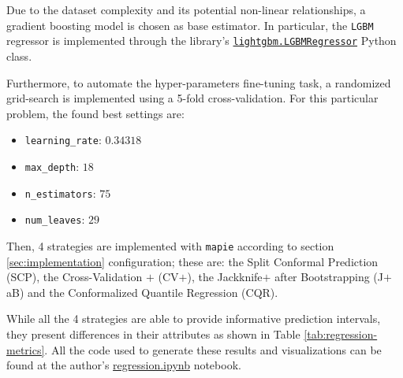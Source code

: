 Due to the dataset complexity and its potential non-linear relationships, a gradient boosting model is chosen as base estimator. In particular, the \texttt{LGBM} regressor is implemented through the library's \href{https://lightgbm.readthedocs.io/en/latest/pythonapi/lightgbm.LGBMRegressor.html#lightgbm.LGBMRegressor}{\texttt{lightgbm.LGBMRegressor}} Python class. 

Furthermore, to automate the hyper-parameters fine-tuning task, a randomized grid-search is implemented using a 5-fold cross-validation. For this particular problem, the found best settings are:
\begin{itemize}
    \setlength{\itemsep}{0pt}
    \item \texttt{learning\_{}rate}: $0.34318$
    \item \texttt{max\_{}depth}: $18$
    \item \texttt{n\_{}estimators}: $75$
    \item \texttt{num\_{}leaves}: $29$
\end{itemize}

Then, 4 strategies are implemented with \texttt{mapie} according to section \ref{sec:implementation} configuration; these are: the Split Conformal Prediction (SCP), the Cross-Validation $+$ (CV$+$), the Jackknife$+$ after Bootstrapping (J$+$aB) and the Conformalized Quantile Regression (CQR).

While all the 4 strategies are able to provide informative prediction intervals, they present differences in their attributes as shown in Table \ref{tab:regression-metrics}. All the code used to generate these results and visualizations can be found at the author's \href{https://github.com/gcastro-98/conformal-prediction/blob/main/regression.ipynb}{regression.ipynb} notebook.

